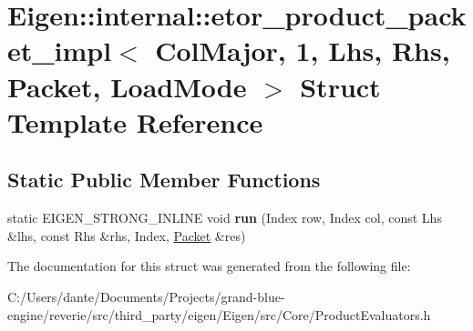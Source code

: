 \hypertarget{struct_eigen_1_1internal_1_1etor__product__packet__impl_3_01_col_major_00_011_00_01_lhs_00_01_rhdf96bb5795bcf311a9f62d6403dd523a}{}\section{Eigen\+::internal\+::etor\+\_\+product\+\_\+packet\+\_\+impl$<$ Col\+Major, 1, Lhs, Rhs, Packet, Load\+Mode $>$ Struct Template Reference}
\label{struct_eigen_1_1internal_1_1etor__product__packet__impl_3_01_col_major_00_011_00_01_lhs_00_01_rhdf96bb5795bcf311a9f62d6403dd523a}
\subsection*{Static Public Member Functions}
\begin{DoxyCompactItemize}
\item 
\mbox{\label{struct_eigen_1_1internal_1_1etor__product__packet__impl_3_01_col_major_00_011_00_01_lhs_00_01_rhdf96bb5795bcf311a9f62d6403dd523a_a8099ba41b5edeed0c467ae767f52f8f5}} 
static E\+I\+G\+E\+N\+\_\+\+S\+T\+R\+O\+N\+G\+\_\+\+I\+N\+L\+I\+NE void {\bfseries run} (Index row, Index col, const Lhs \&lhs, const Rhs \&rhs, Index, \mbox{\hyperlink{union_eigen_1_1internal_1_1_packet}{Packet}} \&res)
\end{DoxyCompactItemize}


The documentation for this struct was generated from the following file\+:\begin{DoxyCompactItemize}
\item 
C\+:/\+Users/dante/\+Documents/\+Projects/grand-\/blue-\/engine/reverie/src/third\+\_\+party/eigen/\+Eigen/src/\+Core/Product\+Evaluators.\+h\end{DoxyCompactItemize}
